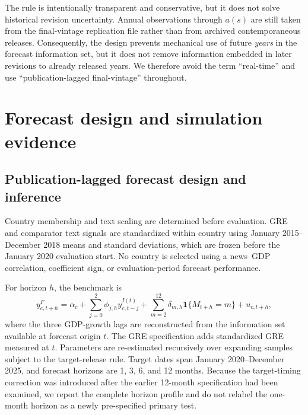 \documentclass[preprint,12pt,authoryear]{elsarticle}
\begin{document}
The rule is intentionally transparent and conservative, but it does not solve historical revision uncertainty. Annual observations through $a(s)$ are still taken from the final-vintage replication file rather than from archived contemporaneous releases. Consequently, the design prevents mechanical use of future \emph{years} in the forecast information set, but it does not remove information embedded in later revisions to already released years. We therefore avoid the term ``real-time'' and use ``publication-lagged final-vintage'' throughout.
\section{Forecast design and simulation evidence}
\subsection{Publication-lagged forecast design and inference}
Country membership and text scaling are determined before evaluation. GRE and comparator text signals are standardized within country using January 2015--December 2018 means and standard deviations, which are frozen before the January 2020 evaluation start. No country is selected using a news--GDP correlation, coefficient sign, or evaluation-period forecast performance.

For horizon $h$, the benchmark is
\begin{equation}
y^{F}_{c,t+h}=\alpha_c+\sum_{j=0}^{2}\phi_{j,h}y^{I(t)}_{c,t-j}
+\sum_{m=2}^{12}\delta_{m,h}\mathbf{1}\{M_{t+h}=m\}+u_{c,t+h},
\label{eq:benchmark}
\end{equation}
where the three GDP-growth lags are reconstructed from the information set available at forecast origin $t$. The GRE specification adds standardized GRE measured at $t$. Parameters are re-estimated recursively over expanding samples subject to the target-release rule. Target dates span January 2020--December 2025, and forecast horizons are 1, 3, 6, and 12 months. Because the target-timing correction was introduced after the earlier 12-month specification had been examined, we report the complete horizon profile and do not relabel the one-month horizon as a newly pre-specified primary test.


\end{document}
